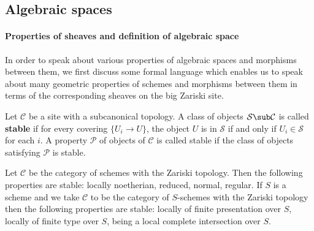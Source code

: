 \subsection{Algebraic spaces}

\paragraph{Properties of sheaves and definition of algebraic space}
In order to speak about various properties of algebraic spaces and morphisms between them, we first discuss some formal language which enables us to speak about many geometric properties of schemes and morphisms between them in terms of the corresponding sheaves on the big Zariski site.

\begin{definition}
Let $\mathcal{C}$ be a site with a subcanonical topology. A class of objects $\mathcal{S}\sub\mathcal{C}$ is called \textbf{stable} if for every covering $\{U_i\to U\}$, the object $U$ is in $\mathcal{S}$ if and only if $U_i\in\mathcal{S}$ for each $i$. A property $\mathcal{P}$ of objects of $\mathcal{C}$ is called stable if the class of objects satisfying $\mathcal{P}$ is stable.
\end{definition}

\begin{example}
Let $\mathcal{C}$ be the category of schemes with the Zariski topology. Then the following properties are stable: locally noetherian, reduced, normal, regular. If $S$ is a scheme and we take $\mathcal{C}$ to be the category of $S$-schemes with the Zariski topology then the following properties are stable: locally of finite presentation over $S$, locally of finite type over $S$, being a local complete intersection over $S$.
\end{example}

